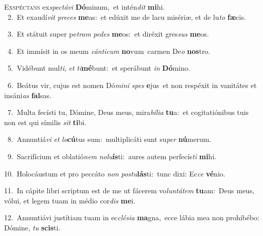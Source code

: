 \lettrine{\initial\textcolor{\initialcolor}{E}}{xspéctans} ex\-\textit{spec}\-\textit{tá}\textit{vi} \textbf{Dó}\-minum,~\star et intén\textit{dit} \textbf{mi}\-hi.\\
{\numbfont\textcolor{\numbcolor}{~2.}}~Et exaudí\textit{vit} \textit{pre}\-\textit{ces} \textbf{me}\-as:~\star et edúxit me de lacu misériæ, et de lu\textit{to} \textbf{fæ}\-cis.\par
{\numbfont\textcolor{\numbcolor}{~3.}}~Et státuit super pe\textit{tram} \textit{pe}\-\textit{des} \textbf{me}\-os:~\star et diréxit gres\textit{sus} \textbf{me}\-os.\par
{\numbfont\textcolor{\numbcolor}{~4.}}~Et immísit in os meum \textit{cán}\-\textit{ti}\textit{cum} \textbf{no}\-vum~\star carmen De\textit{o} \textbf{nos}\-tro.\par
{\numbfont\textcolor{\numbcolor}{~5.}}~Vidébunt mul\-\textit{ti}\-, \textit{et} \textit{ti}\-\textbf{mé}bunt:~\star et sperábunt \textit{in} \textbf{Dó}\-mino.\par
{\numbfont\textcolor{\numbcolor}{~6.}}~Beátus vir, cujus est nomen Dó\-\textit{mi}\-\textit{ni} \textit{spes} \textbf{e}\-jus~\star et non respéxit in vanitátes et insáni\textit{as} \textbf{fal}\-sas.\par
{\numbfont\textcolor{\numbcolor}{~7.}}~Multa fecísti tu, Dómine, Deus meus, mira\-\textit{bí}\-\textit{li}\textit{a} \textbf{tu}\-a:~\star et cogitatiónibus tuis non est qui símilis \textit{sit} \textbf{ti}\-bi.\par
{\numbfont\textcolor{\numbcolor}{~8.}}~Annuntiá\textit{vi} \textit{et} \textit{lo}\-\textbf{cú}tus sum:~\star multiplicáti sunt su\textit{per} \textbf{nú}\-merum.\par
{\numbfont\textcolor{\numbcolor}{~9.}}~Sacrifícium et oblatió\textit{nem} \textit{no}\-\textit{lu}\textbf{ís}ti:~\star aures autem perfecís\textit{ti} \textbf{mi}\-hi.\par
{\numbfont\textcolor{\numbcolor}{10.}}~Holocáustum et pro peccáto \textit{non} \textit{pos}\-\textit{tu}\textbf{lás}ti:~\star tunc dixi: Ec\textit{ce} \textbf{vé}\-nio.\par
{\numbfont\textcolor{\numbcolor}{11.}}~In cápite libri scriptum est de me ut fácerem vo\-\textit{lun}\-\textit{tá}\textit{tem} \textbf{tu}\-am:~\star Deus meus, vólui, et legem tuam in médio cor\textit{dis} \textbf{me}\-i.\par
{\numbfont\textcolor{\numbcolor}{12.}}~Annuntiávi justítiam tuam in ec\-\textit{clé}\-\textit{si}\textit{a} \textbf{ma}\-gna,~\star ecce lábia mea non prohibébo: Dómine, \textit{tu} \textbf{scis}\-ti.\par
